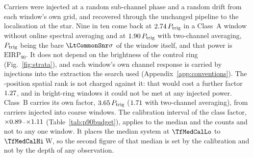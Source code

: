 Carriers were injected at a random sub-channel phase and a random drift from
each window's own grid, and recovered through the unchanged pipeline to the
localisation at the star. Nine in ten come back at
$2.74\,P_{\rm trig}$ in a Class~A window without online spectral
averaging and at $1.90\,P_{\rm trig}$ with two-channel averaging,
$P_{\rm trig}$ being the bare
$\LtCommonSnr\sigma$ of the window itself, and that power is
$\mathrm{EIRP}_{90}$. It does not depend on the brightness of the control ring
(Fig.~\ref{fig:strata}), and each window's own channel response is carried
by injections into the extraction the search used (Appendix~\ref{app:conventions}). The \NCtrl-position
spatial rank is not charged against it: that would cost a further factor
$1.27$, and in \SensNRingHiUnres{} bright-ring windows it could not be
met at any injected power. Class~B carries its own factor,
$3.65\,P_{\rm trig}$ ($1.71$ with two-channel averaging), from \SensNToneCoarse{} carriers injected
into \SensNInjCoarse{} coarse windows. The calibration interval of the class factor,
$\times0.89$--$\times1.11$ (Table~\ref{tab:p90budget}), applies to the median and the counts and not to any one window. It places the
median system at $\TfMedCalLo$ to $\TfMedCalHi$\,W, so the second figure of that
median is set by the calibration and not by the depth of any observation.

